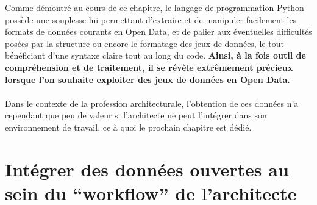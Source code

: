 \documentclass[
  11pt,
  french,
]{article}
\begin{document}
Comme démontré au cours de ce chapitre, le langage de programmation
Python possède une souplesse lui permettant d'extraire et de manipuler
facilement les formats de données courants en Open Data, et de palier
aux éventuelles difficultés posées par la structure ou encore le
formatage des jeux de données, le tout bénéficiant d'une syntaxe claire
tout au long du code. \textbf{Ainsi, à la fois outil de compréhension et
de traitement, il se révèle extrêmement précieux lorsque l'on souhaite
exploiter des jeux de données en Open Data.}\\
~\\
Dans le contexte de la profession architecturale, l'obtention de ces
données n'a cependant que peu de valeur si l'architecte ne peut
l'intégrer dans son environnement de travail, ce à quoi le prochain
chapitre est dédié.

\newpage

\hypertarget{intuxe9grer-des-donnuxe9es-ouvertes-au-sein-du-workflow-de-larchitecte}{%
\section{Intégrer des données ouvertes au sein du ``workflow'' de
l'architecte}\label{intuxe9grer-des-donnuxe9es-ouvertes-au-sein-du-workflow-de-larchitecte}}
\end{document}
